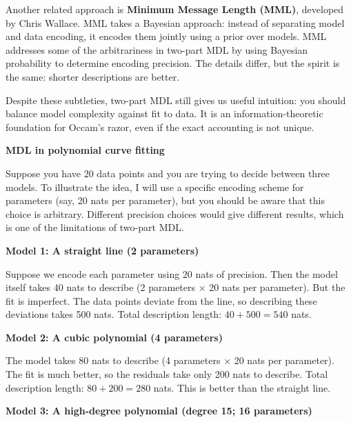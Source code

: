 Another related approach is \textbf{Minimum Message Length (MML)}, developed by Chris Wallace. MML takes a Bayesian approach: instead of separating model and data encoding, it encodes them jointly using a prior over models. MML addresses some of the arbitrariness in two-part MDL by using Bayesian probability to determine encoding precision. The details differ, but the spirit is the same: shorter descriptions are better.

Despite these subtleties, two-part MDL still gives us useful intuition: you should balance model complexity against fit to data. It is an information-theoretic foundation for Occam's razor, even if the exact accounting is not unique.

\vspace{1.5em}

\begin{examplebox}
\textbf{MDL in polynomial curve fitting}

\vspace{0.5em}

Suppose you have 20 data points and you are trying to decide between three models. To illustrate the idea, I will use a specific encoding scheme for parameters (say, 20 nats per parameter), but you should be aware that this choice is arbitrary. Different precision choices would give different results, which is one of the limitations of two-part MDL.

\vspace{0.5em}

\textbf{Model 1: A straight line (2 parameters)}

Suppose we encode each parameter using 20 nats of precision. Then the model itself takes 40 nats to describe (2 parameters × 20 nats per parameter). But the fit is imperfect. The data points deviate from the line, so describing these deviations takes 500 nats. Total description length: $40 + 500 = 540$ nats.

\vspace{0.5em}

\textbf{Model 2: A cubic polynomial (4 parameters)}

The model takes 80 nats to describe (4 parameters × 20 nats per parameter). The fit is much better, so the residuals take only 200 nats to describe. Total description length: $80 + 200 = 280$ nats. This is better than the straight line.

\vspace{0.5em}

\textbf{Model 3: A high-degree polynomial (degree 15; 16 parameters)}


\end{examplebox}
